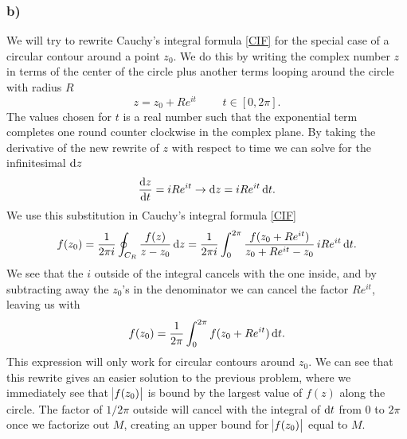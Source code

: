 \documentclass[12pt,twoside]{article}
\begin{document}
\subsubsection*{b)}
We will try to rewrite Cauchy's integral formula \eqref{CIF} for the special case of a circular contour around a point $z_0$. We do this by writing the complex number $z$ in terms of the center of the circle plus another terms looping around the circle with radius $R$
\begin{equation}
  z = z_0 + R e^{it} \,\,\qquad t \in [0, 2\pi].
\end{equation}
The values chosen for $t$ is a real number such that the exponential term completes one round counter clockwise in the complex plane. By taking the derivative of the new rewrite of $z$ with respect to time we can solve for the infinitesimal $\dif z$
\begin{equation}
  \frac{\dif z}{\dif t} = iRe^{it} \rightarrow \dif z = iRe^{it} \dif t.
\end{equation}
We use this substitution in Cauchy's integral formula \eqref{CIF}
\begin{equation}
  f(z_0) = \frac{1}{2\pi i} \oint_{C_R} \frac{f(z)}{z-z_0}\dif z = \frac{1}{2\pi i} \int_{0}^{2\pi} \frac{f(z_0+Re^{it})}{z_0+Re^{it}-z_0}\,iRe^{it} \dif t.
\end{equation}
We see that the $i$ outside of the integral cancels with the one inside, and by subtracting away the $z_0$'s in the denominator we can cancel the factor $Re^{it}$, leaving us with
\begin{equation}
  f(z_0) = \frac{1}{2\pi} \int_{0}^{2\pi} f(z_0+Re^{it}) \dif t. \label{answer1b}
\end{equation}
This expression will only work for circular contours around $z_0$. We can see that this rewrite gives an easier solution to the previous problem, where we immediately see that $\abs{f(z_0)}$ is bound by the largest value of $f(z)$ along the circle. The factor of $1/2\pi$ outside will cancel with the integral of $\dif t$ from $0$ to $2\pi$ once we factorize out $M$, creating an upper bound for $\abs{f(z_0)}$ equal to $M$.
\end{document}
